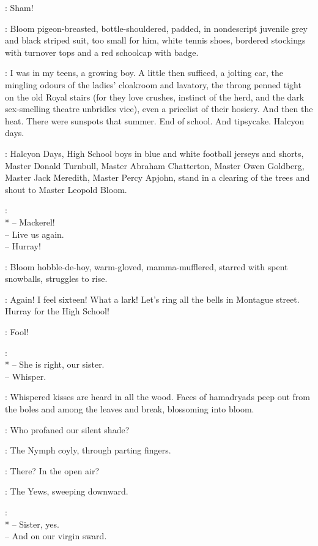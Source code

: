 \Echo:
Sham!

:
Bloom pigeon-breasted, bottle-shouldered, padded,
in nondescript juvenile grey and black striped suit,
too small for him, white tennis shoes,
bordered stockings with turnover tops and a red schoolcap with badge.

\Bloom:
I was in my teens, a growing boy.
A little then sufficed, a jolting car,
the mingling odours of the ladies' cloakroom and lavatory,
the throng penned tight on the old Royal stairs
(for they love crushes, instinct of the herd,
and the dark sex-smelling theatre unbridles vice),
even a pricelist of their hosiery.
And then the heat.
There were sunspots that summer.
End of school.
And tipsycake.
Halcyon days.

:
Halcyon Days, High School boys in blue and white football jerseys and shorts,
Master Donald Turnbull, Master Abraham Chatterton, Master Owen Goldberg,
Master Jack Meredith, Master Percy Apjohn,
stand in a clearing of the trees and shout to Master Leopold Bloom.

\HalcyonDays:
\\*
-- Mackerel!\\
-- Live us again.\\
-- Hurray!\\

:
Bloom hobble-de-hoy, warm-gloved, mamma-mufflered,
starred with spent snowballs, struggles to rise.

\Bloom:
Again!
I feel sixteen!
What a lark!
Let's ring all the bells in Montague street.
Hurray for the High School!

\Echo:
Fool!

\Yews:
\\*
-- She is right, our sister.\\
-- Whisper.%

:
Whispered kisses are heard in all the wood.
Faces of hamadryads peep out from the boles
and among the leaves and break, blossoming into bloom.

\Yews:
Who profaned our silent shade?

:
The Nymph coyly, through parting fingers.

\Nymph:
There?
In the open air?

:
The Yews, sweeping downward.

\Yews:\\*
-- Sister, yes.\\
-- And on our virgin sward.

